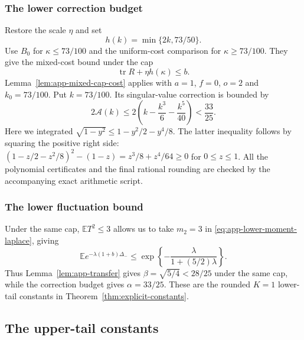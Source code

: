\documentclass[11pt,a4paper]{article}
\numberwithin{equation}{section}
\begin{document}
\subsubsection{The lower correction budget}
Restore the scale $\eta$ and set
\[
 h(k)=\min\{2k,73/50\}.
\]
Use $B_0$ for $\kappa\le73/100$ and the uniform-cost comparison
for $\kappa\ge73/100$. They give the mixed-cost bound under the cap
\[
 \operatorname{tr}R+\eta h(\kappa)\le b.
\]
Lemma~\ref{lem:app-mixed-cap-cost} applies with
$a=1$, $f=0$, $o=2$ and $k_0=73/100$.
Put $k=73/100$. Its singular-value correction is bounded by
\[
 2\mathcal A(k)\le2\left(k-\frac{k^3}{6}-\frac{k^5}{40}\right)
 <\frac{33}{25}.
\]
Here we integrated $\sqrt{1-y^2}\le1-y^2/2-y^4/8$.
The latter inequality follows by squaring the positive right side:
$(1-z/2-z^2/8)^2-(1-z)=z^3/8+z^4/64\ge0$ for $0\le z\le1$.
All the polynomial certificates and the final rational rounding are checked by the
accompanying exact arithmetic script.



\subsubsection{The lower fluctuation bound}
Under the same cap, $\mathbb ET^2\le3$ allows us to take $m_2=3$ in
\eqref{eq:app-lower-moment-laplace}, giving
\begin{equation}\label{eq:app-K-one-laplace}
 \mathbb Ee^{-\lambda(1+b)\Delta_-}
 \le\exp\left\{-\frac{\lambda}{1+(5/2)\lambda}\right\}.
\end{equation}
Thus Lemma~\ref{lem:app-transfer} gives
$\beta=\sqrt{5/4}<28/25$ under the same cap, while the correction
budget gives $\alpha=33/25$.
These are the rounded $K=1$ lower-tail constants in
Theorem~\ref{thm:explicit-constants}.


\subsection{The upper-tail constants}\label{app:upper-constants}
\end{document}
